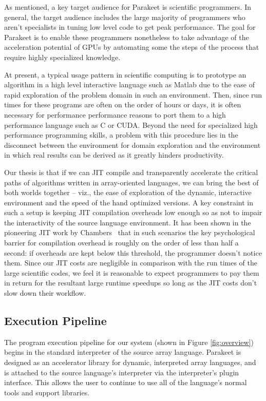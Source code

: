 \documentclass[preprint]{sigplanconf}
\begin{document}
As mentioned, a key target audience for Parakeet is scientific programmers. In general, the target audience includes the large majority of programmers who aren't specialists in tuning low level code to get peak performance.  The goal for Parakeet is to enable these programmers nonetheless to take advantage of the acceleration potential of GPUs by automating some the steps of the process that require highly specialized knowledge.

At present, a typical usage pattern in scientific computing is to prototype an algorithm in a high level interactive language such as Matlab due to the ease of rapid exploration of the problem domain in such an environment.  Then, since run times for these programs are often on the order of hours or days, it is often necessary for performance performance reasons to port them to a high performance language such as C or CUDA.  Beyond the need for specialized high performance programming skills, a problem with this procedure  lies in the disconnect between the environment for domain exploration and the environment in which real results can be derived as it greatly hinders productivity.

Our thesis is that if we can JIT compile and transparently accelerate the critical paths of algorithms written in array-oriented languages, we can bring the best of both worlds together -- viz., the ease of exploration of the dynamic, interactive environment and the speed of the hand optimized versions. A key constraint in such a setup is keeping JIT compilation overheads low enough so as not to impair the interactivity of the source language environment.  It has been shown in the pioneering JIT work by Chambers~\cite{Cham92} that in such scenarios the key psychological barrier for compilation overhead is roughly on the order of less than half a second: if overheads are kept below this threshold, the programmer doesn't notice them.  Since our JIT costs are negligible in comparison with the run times of the large scientific codes, we feel it is reasonable to expect programmers to pay them in return for the resultant large runtime speedups so long as the JIT costs don't slow down their workflow.

\subsection{Execution Pipeline}
\label{executionpipeline}

The program execution pipeline for our system (shown in Figure \ref{fig:overview}) begins in the standard interpreter of the source array language.  Parakeet is designed as an accelerator library for dynamic, interpreted array languages, and is attached to the source language's interpreter via the interpreter's plugin interface. This allows the user to continue to use all of the language's normal tools and support libraries.
\end{document}
